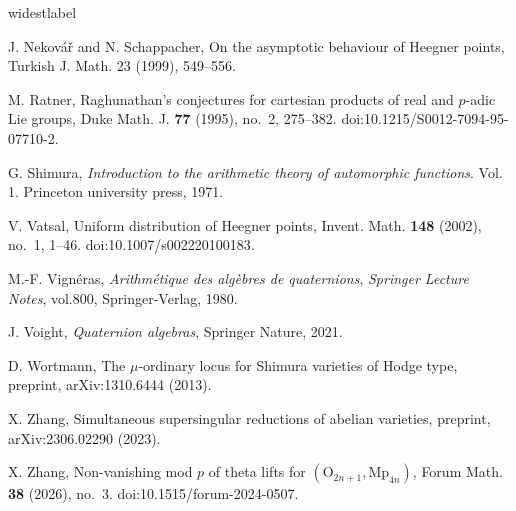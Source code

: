 \documentclass[11pt,oneside,reqno]{amsart}
\theoremstyle{plain}
\begin{document}
\begin{thebibliography}{widestlabel}
		
		J. Nekov\'{a}\v{r} and N. Schappacher,
		On the asymptotic behaviour of Heegner points,
		Turkish J. Math. 23 (1999), 549--556.
		
		
		
		
		M. Ratner,
		Raghunathan's conjectures for cartesian products of real and $p$-adic Lie groups,
		Duke Math. J. \textbf{77} (1995), no.~2, 275--382.
		doi:10.1215/S0012-7094-95-07710-2.
		
		
		
		
		
		
		G. Shimura,
		\emph{Introduction to the arithmetic theory of automorphic functions}. Vol. 1. Princeton university press, 1971.
		
		
		
		
		
		
		
		V. Vatsal,
		Uniform distribution of Heegner points,
		Invent. Math. \textbf{148} (2002), no.~1, 1--46.
		doi:10.1007/s002220100183.
		
		
		
		
		M.-F. Vignéras,
		\textit{Arithmétique des algèbres de quaternions},
		\textit{Springer Lecture Notes},
		vol.800,
		Springer-Verlag,
		1980.
		
		
		
		J. Voight,
		\emph{Quaternion algebras},
		Springer Nature, 2021.
		
		
		D. Wortmann,
		The $\mu$-ordinary locus for Shimura varieties of Hodge type,
		preprint, arXiv:1310.6444 (2013).
		
		
		
		
		X. Zhang,
		Simultaneous supersingular reductions of abelian varieties,
		preprint, arXiv:2306.02290 (2023).
		
		
		
		X. Zhang,
		Non-vanishing mod $p$ of theta lifts for $(\mathrm{O}_{2n+1},\mathrm{Mp}_{4n})$,
		Forum Math. \textbf{38} (2026), no.~3.
		doi:10.1515/forum-2024-0507.
		
		
	\end{thebibliography}
	
	
\end{document}

